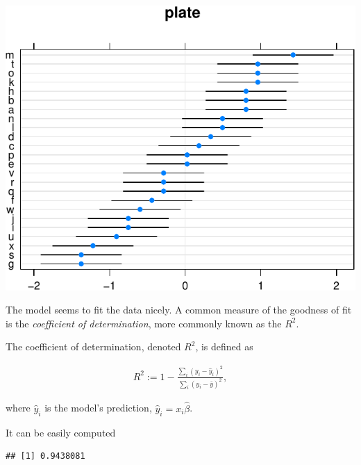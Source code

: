 \documentclass[]{book}
\newenvironment{Shaded}{\begin{snugshade}}{\end{snugshade}}
\newcommand{\KeywordTok}[1]{\textcolor[rgb]{0.13,0.29,0.53}{\textbf{#1}}}
\newcommand{\DataTypeTok}[1]{\textcolor[rgb]{0.13,0.29,0.53}{#1}}
\newcommand{\DecValTok}[1]{\textcolor[rgb]{0.00,0.00,0.81}{#1}}
\newcommand{\StringTok}[1]{\textcolor[rgb]{0.31,0.60,0.02}{#1}}
\newcommand{\ControlFlowTok}[1]{\textcolor[rgb]{0.13,0.29,0.53}{\textbf{#1}}}
\newcommand{\OperatorTok}[1]{\textcolor[rgb]{0.81,0.36,0.00}{\textbf{#1}}}
\newcommand{\NormalTok}[1]{#1}
\theoremstyle{definition}
\theoremstyle{definition}
\theoremstyle{definition}
\theoremstyle{remark}
\let\BeginKnitrBlock\begin \let\EndKnitrBlock\end
\begin{document}
\includegraphics[width=0.5\linewidth]{Rcourse_files/figure-latex/unnamed-chunk-157-1}

The model seems to fit the data nicely. A common measure of the goodness
of fit is the \emph{coefficient of determination}, more commonly known
as the \(R^2\).



\BeginKnitrBlock{definition}[R2]
\protect\hypertarget{def:unnamed-chunk-158}{}{\label{def:unnamed-chunk-158}
{} }The coefficient of determination, denoted \(R^2\),
is defined as

\begin{align}
  R^2:= 1-\frac{\sum_i (y_i - \hat y_i)^2}{\sum_i (y_i - \bar y)^2},
\end{align}

where \(\hat y_i\) is the model's prediction,
\(\hat y_i = x_i \hat \beta\).
\EndKnitrBlock{definition}

It can be easily computed

\begin{Shaded}
\end{Shaded}

\begin{verbatim}
## [1] 0.9438081
\end{verbatim}
\end{document}
